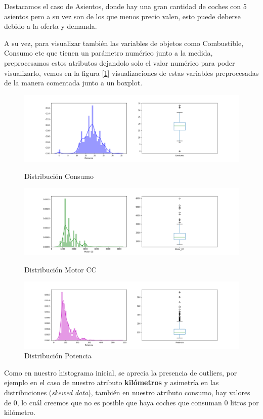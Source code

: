 \documentclass[12pt,twoside]{report}
\begin{document}
Destacamos el caso de Asientos, donde hay una gran cantidad de coches con 5 asientos pero a su vez son de los que menos precio valen, esto puede deberse debido a la oferta y demanda.

A su vez, para visualizar también las variables de objetos como Combustible, Consumo etc que tienen un parámetro numérico junto a la medida, preprocesamos estos atributos dejandolo solo el valor numérico para poder visualizarlo, vemos en la figura [\ref{fig:dis_atributos}] visualizaciones de estas variables preprocesadas de la manera comentada junto a un boxplot.

\begin{figure}[H]
\includegraphics[width=\textwidth]{../notebooks/figures/consumo_dis.png}
\caption{Distribución Consumo}
\includegraphics[width=\textwidth]{../notebooks/figures/motor_dis.png}
\caption{Distribución Motor CC}
\includegraphics[width=\textwidth]{../notebooks/figures/potencia_dis.png}
\caption{Distribución Potencia}
\label{fig:dis_atributos}
\end{figure}

Como en nuestro histograma inicial, se aprecia la presencia de outliers, por ejemplo en el caso de nuestro atributo \textbf{kilómetros} y asimetría en las distribuciones (\textit{skewed data}), también en nuestro atributo consumo, hay valores de 0, lo cuál creemos que no es posible que haya coches que consuman 0 litros por kilómetro.
\end{document}
